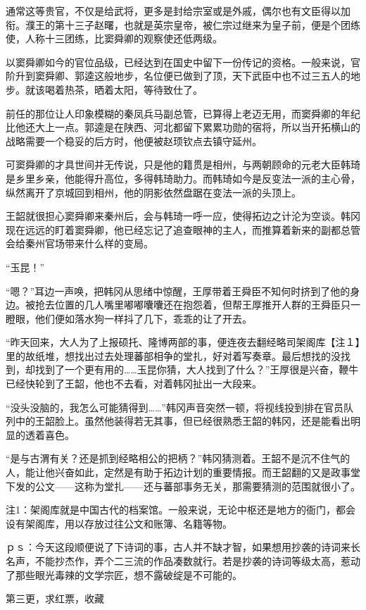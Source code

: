 通常这等贵官，不仅是给武将，更多是封给宗室或是外戚，偶尔也有文臣得以加衔。濮王的第十三子赵曙，也就是英宗皇帝，被仁宗过继来为皇子前，便是个团练使，人称十三团练，比窦舜卿的观察使还低两级。

以窦舜卿如今的官位品级，已经达到在国史中留下一份传记的资格。一般来说，官阶升到窦舜卿、郭逵这般地步，名位便已做到了顶，天下武臣中也不过三五人的地步。就该喝着热茶，晒着太阳，等待致仕了。

前任的那位让人印象模糊的秦凤兵马副总管，已算得上老迈无用，而窦舜卿的年纪比他还大上一点。郭逵是在陕西、河北都留下累累功勋的宿将，所以当开拓横山的战略需要一个稳妥的后方时，他便被赵顼钦点去镇守延州。

可窦舜卿的才具世间并无传说，只是他的籍贯是相州，与两朝顾命的元老大臣韩琦是乡里乡亲，他能得升高位，多得韩琦助力。而韩琦如今是反变法一派的主心骨，纵然离开了京城回到相州，他的阴影依然盘踞在变法一派的头顶上。

王韶就很担心窦舜卿来秦州后，会与韩琦一呼一应，使得拓边之计沦为空谈。韩冈现在远远的盯着窦舜卿，他已经忘记了追查眼神的主人，而推算着新来的副都总管会给秦州官场带来什么样的变局。

“玉昆！”

“嗯？”耳边一声唤，把韩冈从思绪中惊醒，王厚带着王舜臣不知何时挤到了他的身边。被抢去位置的几人嘴里嘟嘟囔囔还在抱怨着，但帮王厚推开人群的王舜臣只一瞪眼，他们便如落水狗一样抖了几下，乖乖的让了开去。

“昨天回来，大人为了上报硕托、隆博两部的事，便连夜去翻经略司架阁库【注１】里的故纸堆，想找出过去处理蕃部相争的堂扎，好对着写奏章。最后想找的没找到，却找到了一个更有用的……玉昆你猜，大人找到了什么？”王厚很是兴奋，鞭牛已经快轮到了王韶，他也不去看，对着韩冈扯出一大段来。

“没头没脑的，我怎么可能猜得到……”韩冈声音突然一顿，将视线投到排在官员队列中的王韶脸上。虽然他装得若无其事，但已经很熟悉王韶的韩冈，还是能看出明显的透着喜色。

“是与古渭有关？还是抓到经略相公的把柄？”韩冈猜测着。王韶不是沉不住气的人，能让他兴奋如此，定然是有助于拓边计划的重要情报。而王韶翻的又是政事堂下发的公文——这称为堂扎——还与蕃部事务无关，那需要猜测的范围就很小了。

注1：架阁库就是中国古代的档案馆。一般来说，无论中枢还是地方的衙门，都会设有架阁库，用以存放过往公文和账簿、名籍等物。

ｐｓ：今天这段顺便说了下诗词的事，古人并不缺才智，如果想用抄袭的诗词来长名声，不能抄杰作，弄个二三流的作品凑数就行。若是抄袭的诗词等级太高，惹动了那些眼光毒辣的文学宗匠，想不露破绽是不可能的。

第三更，求红票，收藏


